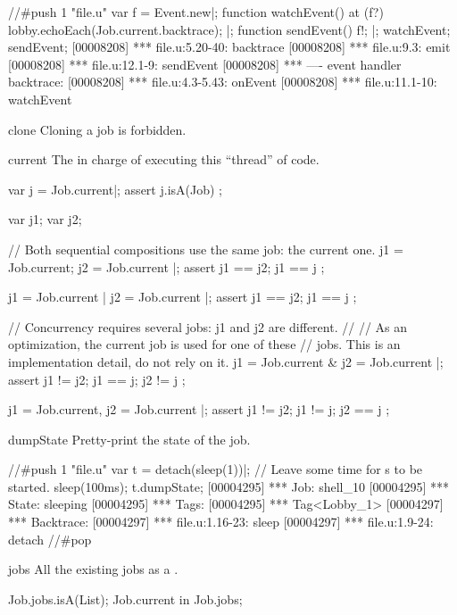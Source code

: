 \begin{urbiscriptapi}
\begin{urbiscript}
//#push 1 "file.u"
var f = Event.new|;
function watchEvent()
{
  at (f?)
    lobby.echoEach(Job.current.backtrace);
}|;
function sendEvent()
{
  f!;
}|;
watchEvent;
sendEvent;
[00008208] *** file.u:5.20-40: backtrace
[00008208] *** file.u:9.3: emit
[00008208] *** file.u:12.1-9: sendEvent
[00008208] *** ---- event handler backtrace:
[00008208] *** file.u:4.3-5.43: onEvent
[00008208] *** file.u:11.1-10: watchEvent
\end{urbiscript}

\item[clone]
  Cloning a job is forbidden.

\item[current]%
  The  in charge of executing this ``thread'' of code.
\begin{urbiscript}
var j = Job.current|;
assert { j.isA(Job) };

var j1; var j2;

// Both sequential compositions use the same job: the current one.
{ j1 = Job.current; j2 = Job.current }|;
assert { j1 == j2; j1 == j };

{ j1 = Job.current | j2 = Job.current }|;
assert { j1 == j2; j1 == j };

// Concurrency requires several jobs: j1 and j2 are different.
//
// As an optimization, the current job is used for one of these
// jobs.  This is an implementation detail, do not rely on it.
{ j1 = Job.current & j2 = Job.current }|;
assert { j1 != j2; j1 == j; j2 != j };

{ j1 = Job.current, j2 = Job.current }|;
assert { j1 != j2; j1 != j; j2 == j };
\end{urbiscript}

\item[dumpState]
  Pretty-print the state of the job.

\begin{urbiscript}
//#push 1 "file.u"
var t = detach(sleep(1))|;
// Leave some time for s to be started.
sleep(100ms);
t.dumpState;
[00004295] *** Job: shell_10
[00004295] ***   State: sleeping
[00004295] ***   Tags:
[00004295] ***     Tag<Lobby_1>
[00004297] ***   Backtrace:
[00004297] ***     file.u:1.16-23: sleep
[00004297] ***     file.u:1.9-24: detach
//#pop
\end{urbiscript}

\item[jobs]%
  All the existing jobs as a .
\begin{urbiassert}
Job.jobs.isA(List);
Job.current in Job.jobs;
\end{urbiassert}


\end{urbiscriptapi}
